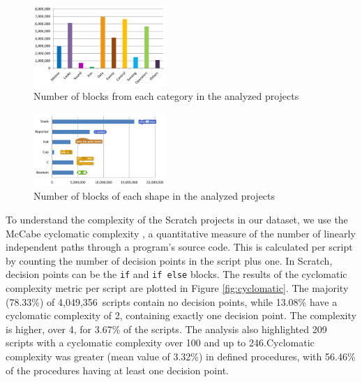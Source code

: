 \documentclass{sig-alternate}
\newcommand{\nscripts}{4,049,356}
\begin{document}
\begin{figure}
	\centering
	\includegraphics[width=0.45\textwidth]{fig/charts/16Categories}
	\caption{Number of blocks from each category in the analyzed projects}
	\label{fig:categories}
\end{figure}
\begin{figure}
	\centering
	\includegraphics[width=0.45\textwidth]{fig/charts/16Shapes}
	\caption{Number of blocks of each shape in the analyzed projects}
	\label{fig:shapes}
\end{figure}

To understand the complexity of the Scratch projects in our dataset, we use the McCabe cyclomatic complexity \cite{mcCabe76}, a quantitative measure of the number of linearly independent paths through a program's source code. This is calculated per script by counting the number of decision points in the script plus one. In Scratch, decision points can be the \texttt{if} and \texttt{if else} blocks. The results of the cyclomatic complexity metric per script are plotted in Figure \ref{fig:cyclomatic}. The majority (78.33\%) of \nscripts~scripts contain no decision points, while 13.08\% have a cyclomatic complexity of 2, containing exactly one decision point. The complexity is higher, over 4, for 3.67\% of the scripts. The analysis also highlighted 209 scripts with a cyclomatic complexity over 100 and up to 246.\footnotemark[\ref{repo}] Cyclomatic complexity was greater (mean value of 3.32\%) in defined procedures, with 56.46\% of the procedures having at least one decision point.

\noindent
{}
\end{document}
